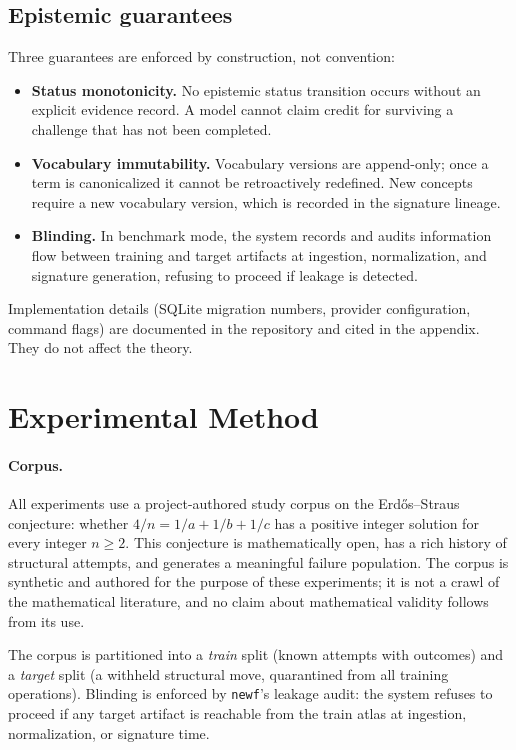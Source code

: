 \documentclass[11pt]{article}
\theoremstyle{gowthm}
\theoremstyle{gowplain}
\begin{document}
\subsection{Epistemic guarantees}

Three guarantees are enforced by construction, not convention:

\begin{itemize}[nosep]
  \item \textbf{Status monotonicity.} No epistemic status transition occurs
    without an explicit evidence record. A model cannot claim credit for
    surviving a challenge that has not been completed.
  \item \textbf{Vocabulary immutability.} Vocabulary versions are append-only;
    once a term is canonicalized it cannot be retroactively redefined. New
    concepts require a new vocabulary version, which is recorded in the
    signature lineage.
  \item \textbf{Blinding.} In benchmark mode, the system records and audits
    information flow between training and target artifacts at ingestion,
    normalization, and signature generation, refusing to proceed if leakage
    is detected.
\end{itemize}

Implementation details (SQLite migration numbers, provider configuration,
command flags) are documented in the repository and cited in the appendix.
They do not affect the theory.

\section{Experimental Method}
\label{sec:method-exp}

\paragraph{Corpus.}
All experiments use a project-authored study corpus on the Erd\H{o}s--Straus
conjecture: whether $4/n = 1/a + 1/b + 1/c$ has a positive integer solution
for every integer $n \geq 2$. This conjecture is mathematically open, has a
rich history of structural attempts, and generates a meaningful failure
population. The corpus is synthetic and authored for the purpose of these
experiments; it is not a crawl of the mathematical literature, and no claim
about mathematical validity follows from its use.

The corpus is partitioned into a \emph{train} split (known attempts with
outcomes) and a \emph{target} split (a withheld structural move, quarantined
from all training operations). Blinding is enforced by \texttt{newf}'s leakage
audit: the system refuses to proceed if any target artifact is reachable from
the train atlas at ingestion, normalization, or signature time.
\end{document}
